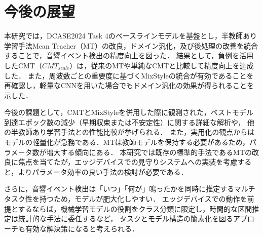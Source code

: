 \documentclass[main]{subfiles}
\begin{document}
\chapter{今後の展望}
本研究では，DCASE2024 Task 4のベースラインモデルを基盤とし，半教師あり学習手法Mean Teacher（MT）の改良，ドメイン汎化，及び後処理の改善を統合することで，音響イベント検出の精度向上を図った． 
結果として，負例を活用したCMT（$CMT_{scale}$）は，従来のMTや単純なCMTと比較して精度向上を達成した．
また，周波数ごとの重要度に基づくMixStyleの統合が有効であることを再確認し，軽量なCNNを用いた場合でもドメイン汎化の効果が得られることを示した．\par

今後の課題として，CMTとMixStyleを併用した際に観測された，ベストモデル到達エポック数の減少（早期収束または不安定性）に関する詳細な解析や，
他の半教師あり学習手法との性能比較が挙げられる．
また，実用化の観点からはモデルの軽量化が急務である．MTは教師モデルを保持する必要があるため，パラメータ数が増大する傾向にある．
本研究では既存の標準的手法であるMTの改良に焦点を当てたが，エッジデバイスでの見守りシステムへの実装を考慮すると，よりパラメータ効率の良い手法の検討が必要である．\par 

さらに，音響イベント検出は「いつ」「何が」鳴ったかを同時に推定するマルチタスク性を持つため，モデルが肥大化しやすい．
エッジデバイスでの動作を前提とするならば，機械学習モデルの役割をクラス分類に限定し，時間的な区間推定は統計的な手法に委任するなど，
タスクとモデル構造の簡素化を図るアプローチも有効な解決策になると考えられる．
\end{document}
